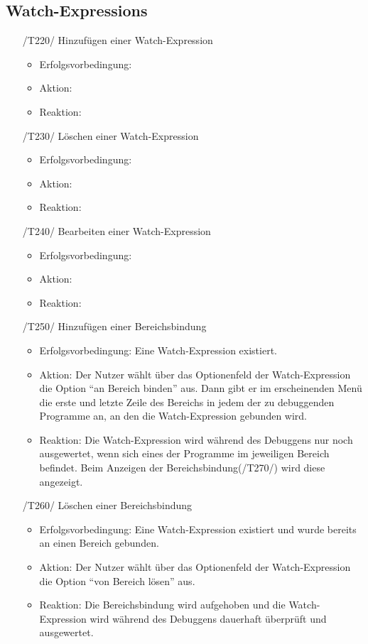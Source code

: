 \documentclass[parskip=full]{scrartcl}
\begin{document}
\subsection{Watch-Expressions}

\begin{itemize}

	\item[/T220/] Hinzufügen einer \gls{Watch-Expression}
		\begin{itemize}
		\item Erfolgsvorbedingung:
		\item Aktion:
		\item Reaktion:		
		\end{itemize}	
	
	\item[/T230/] Löschen einer Watch-Expression
		\begin{itemize}
		\item Erfolgsvorbedingung:
		\item Aktion:
		\item Reaktion:		
		\end{itemize}	
	
	\item[/T240/] Bearbeiten einer Watch-Expression
		\begin{itemize}
		\item Erfolgsvorbedingung:
		\item Aktion:
		\item Reaktion:		
		\end{itemize}	
	
	\item[/T250/] Hinzufügen einer Bereichsbindung
		\begin{itemize}
		\item Erfolgsvorbedingung: Eine Watch-Expression existiert.
		\item Aktion: Der Nutzer wählt über das Optionenfeld der Watch-Expression die Option \enquote{an Bereich binden} aus. Dann gibt er im erscheinenden Menü die erste und letzte Zeile des Bereichs in jedem der zu debuggenden Programme an, an den die Watch-Expression gebunden wird. 
		\item Reaktion:	Die Watch-Expression wird während des Debuggens nur noch ausgewertet, wenn sich eines der Programme im jeweiligen Bereich befindet. Beim Anzeigen der Bereichsbindung(/T270/) wird diese angezeigt. 
		\end{itemize}	
	
	\item[/T260/] Löschen einer Bereichsbindung
		\begin{itemize}
		\item Erfolgsvorbedingung: Eine Watch-Expression existiert und wurde bereits an einen Bereich gebunden. 
		\item Aktion: Der Nutzer wählt über das Optionenfeld der Watch-Expression die Option \enquote{von Bereich lösen} aus.
		\item Reaktion:	Die Bereichsbindung wird aufgehoben und die Watch-Expression wird während des Debuggens dauerhaft überprüft und ausgewertet.
		\end{itemize}	
	

\end{itemize}
\end{document}

